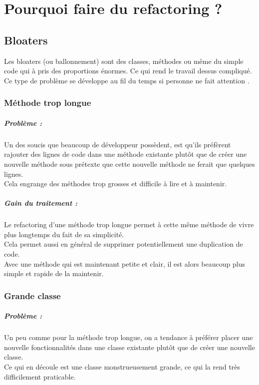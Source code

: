 \documentclass[a4paper,twoside,12pt,openright]{report}
\begin{document}
\chapter{Pourquoi faire du refactoring ?}
\section{Bloaters}
Les bloaters (ou ballonnement) sont des classes, méthodes ou même du simple code qui à pris des proportions énormes. Ce qui rend le travail dessus compliqué. Ce type de problème se développe au fil du temps si personne ne fait attention .\\

\subsection{Méthode trop longue}
\paragraph{Problème :}
Un des soucis que beaucoup de développeur possèdent, est qu'ils préfèrent rajouter des lignes de code dans une méthode existante plutôt que de créer une nouvelle méthode sous prétexte que cette nouvelle méthode ne ferait que quelques lignes.\\
Cela engrange des méthodes trop grosses et difficile à lire et à maintenir.\\

\paragraph{Gain du traitement :}
Le refactoring d'une méthode trop longue permet à cette même méthode de vivre plus longtemps du fait de sa simplicité.\\
Cela permet aussi en général de supprimer potentiellement une duplication de code.\\
Avec une méthode qui est maintenant petite et clair, il est alors beaucoup plus simple et rapide de la maintenir.\\

\subsection{Grande classe}
\paragraph{Problème :}
Un peu comme pour la méthode trop longue, on a tendance à préférer placer une nouvelle fonctionnalités dans une classe existante plutôt que de créer une nouvelle classe.\\
Ce qui en découle est une classe monstrueusement grande, ce qui la rend très difficilement praticable.\\
\end{document}
